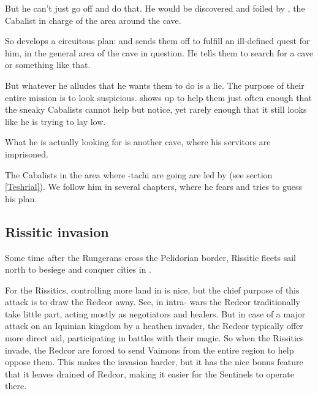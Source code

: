 But he can't just go off and do that. He would be discovered and foiled by , the Cabalist in charge of the area around the cave. 

So \Ishnaruchaefir{} develops a circuitous plan: 
 and sends them off to fulfill an ill-defined quest for him, in the general area of the cave in question. He tells them to search for a cave or something like that. 

But whatever he alludes that he wants them to do is a lie. The purpose of their entire mission is to look suspicious. \Ishnaruchaefir{} shows up to help them just often enough that the sneaky Cabalists cannot help but notice, yet rarely enough that it still looks like he is trying to lay low. 

What he is actually looking for is another cave, where his servitors are imprisoned. 

The Cabalists in the area where \Shilred-tachi are going are led by \Teshrial{} (see section \ref{Teshrial}). We follow him in several chapters, where he fears \Ishnaruchaefir{} and tries to guess his plan. 






\subsection{Rissitic invasion}
Some time after the Rungerans cross the Pelidorian border, Rissitic fleets sail north to besiege and conquer cities in \Scyrum. 


For the Rissitics, controlling more land in \Velcad{} is nice, but the chief purpose of this attack is to draw the Redcor away. See, in intra-\Velcadian{} wars the Redcor traditionally take little part, acting mostly as negotiators and healers. But in case of a major attack on an Iquinian kingdom by a heathen invader, the Redcor typically offer more direct aid, participating in battles with their magic. So when the Rissitics invade, the Redcor are forced to send Vaimons from the entire region to help oppose them. 
This makes the invasion harder, but it has the nice bonus feature that it leaves \Malcur drained of Redcor, making it easier for the Sentinels to operate there. 

